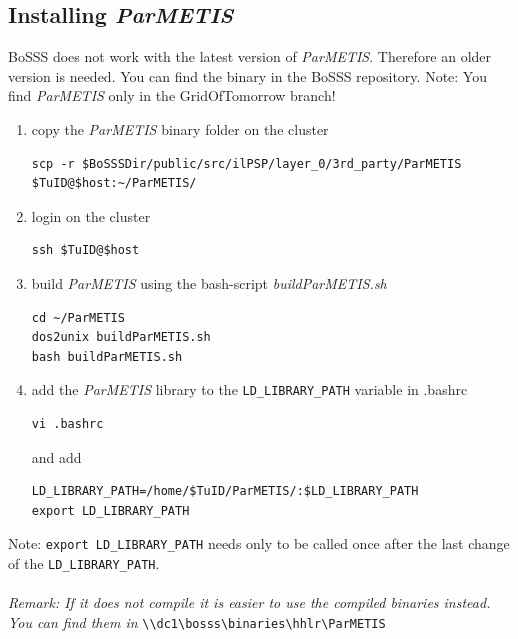 \documentclass[11pt,twoside,a4paper]{fdyartcl}
\begin{document}
\subsection{Installing \emph{ParMETIS}}
BoSSS does not work with the latest version of \emph{ParMETIS}. Therefore an older version is needed. You can find the binary in the BoSSS repository. Note: You find \emph{ParMETIS} only in the GridOfTomorrow branch!
\begin{enumerate}
\item copy the \emph{ParMETIS} binary folder on the cluster
\begin{verbatim}
scp -r $BoSSSDir/public/src/ilPSP/layer_0/3rd_party/ParMETIS $TuID@$host:~/ParMETIS/
\end{verbatim}
\item login on the cluster
\begin{verbatim}
ssh $TuID@$host
\end{verbatim}
\item build \emph{ParMETIS} using the bash-script \emph{buildParMETIS.sh}
\begin{verbatim}
cd ~/ParMETIS
dos2unix buildParMETIS.sh
bash buildParMETIS.sh
\end{verbatim}
\item  add the \emph{ParMETIS} library to the \verb|LD_LIBRARY_PATH| variable in .bashrc
\begin{verbatim}
vi .bashrc
\end{verbatim}
and add
\begin{verbatim}
LD_LIBRARY_PATH=/home/$TuID/ParMETIS/:$LD_LIBRARY_PATH
export LD_LIBRARY_PATH
\end{verbatim}
\end{enumerate}
Note: \verb|export LD_LIBRARY_PATH| needs only to be called once after the last change of the \verb|LD_LIBRARY_PATH|.\\\\
\textit{Remark: If it does not compile it is easier to use the compiled binaries instead. You can find them in} \verb|\\dc1\bosss\binaries\hhlr\ParMETIS|
\end{document}
